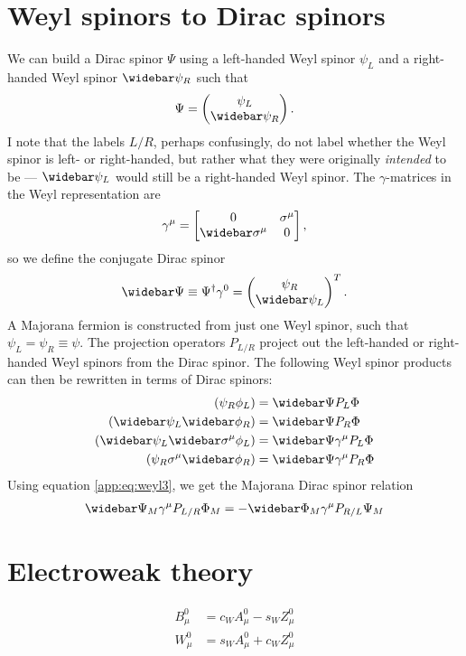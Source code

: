 \documentclass[english, notitlepage]{article}
\begin{document}
\section{Weyl spinors to Dirac spinors}
    We can build a Dirac spinor $\Psi$ using a left-handed Weyl spinor $\psi_L$ and a right-handed Weyl spinor $\wbar{\psi}_R$ such that
    \begin{align}
        \Psi = \begin{pmatrix} \psi_L \\ \wbar{\psi}_R \end{pmatrix}.
    \end{align}
    I note that the labels \(L/R\), perhaps confusingly, do not label whether the Weyl spinor is left- or right-handed, but rather what they were originally \textit{intended} to be --- \(\wbar{\psi}_L\) would still be a right-handed Weyl spinor.
    The $\gamma$-matrices in the Weyl representation are
    \begin{align}
        \gamma^\mu = \begin{bmatrix} 0 & \sigma^\mu \\ \wbar{\sigma}^\mu & 0 \end{bmatrix},
    \end{align}
    so we define the conjugate Dirac spinor
    \begin{align}
        \wbar{\Psi} \equiv \Psi^\dag \gamma^0 = \begin{pmatrix} \psi_R \\ \wbar{\psi}_L \end{pmatrix}^T.
    \end{align}
    A Majorana fermion is constructed from just one Weyl spinor, such that $\psi_L = \psi_R \equiv \psi$.
    The projection operators $P_{L/R}$ project out the left-handed or right-handed Weyl spinors from the Dirac spinor. The following Weyl spinor products can then be rewritten in terms of Dirac spinors:
    \begin{subequations}
        \begin{align}
            (\psi_{R} \phi_{L})                      & = \wbar{\Psi} P_L \Phi            \\
            (\wbar{\psi}_L \wbar{\phi}_R)            & = \wbar{\Psi} P_R \Phi            \\
            (\wbar{\psi}_L \wbar{\sigma}^\mu \phi_L) & = \wbar{\Psi} \gamma^\mu P_L \Phi \\
            (\psi_R \sigma^\mu \wbar{\phi}_R)        & = \wbar{\Psi} \gamma^\mu P_R \Phi
        \end{align}
    \end{subequations}
    Using equation \cref{app:eq:weyl3}, we get the Majorana Dirac spinor relation
    \begin{align}
        \wbar{\Psi}_M \gamma^\mu P_{L/R} \Phi_M = -\wbar{\Phi}_M \gamma^\mu P_{R/L} \Psi_M
    \end{align}

\section{Electroweak theory}
    \begin{subequations}
        \begin{align}
            B^0_\mu & = c_W A^0_\mu - s_W Z^0_\mu \\
            W^0_\mu & = s_W A^0_\mu + c_W Z^0_\mu
        \end{align}
    \end{subequations}
\end{document}
